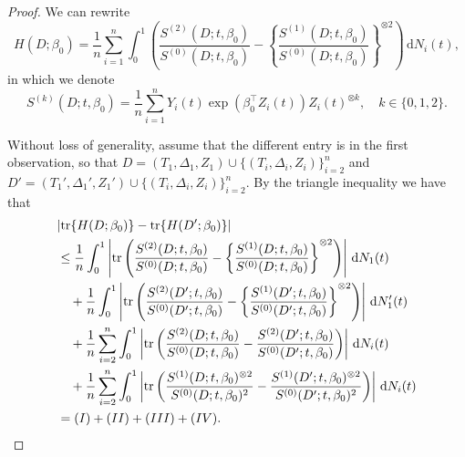 \documentclass[11pt]{article}
\newcommand{\dint}{\,\mathrm{d}}
\begin{document}
\begin{proof}
    We can rewrite  
\begin{equation*}
 H(D; \beta_0)  = \frac{1}{n} \sum_{i=1}^n \int_0^1 \left(\frac{S^{(2)}(D; t, \beta_0)}{{S}^{(0)}(D; t, \beta_0)} - \left\{ \frac{S^{(1)}(D; t, \beta_0)}{S^{(0)}(D; t, \beta_0)} \right\}^{\otimes 2}\right)  \dint N_i(t),
\end{equation*}
in which we denote
\begin{equation*}
    S^{(k)}(D; t, \beta_0) = \frac{1}{n}\sum_{i=1}^n Y_i(t) \exp(\beta_0^\top Z_i(t)) Z_i(t) ^{\otimes k}, \quad k \in \{0, 1, 2\}.
\end{equation*}

Without loss of generality, assume that the different entry is in the first observation, so that $D=(T_1, \Delta_1, Z_1) \cup \{(T_i, \Delta_i, Z_i)\}_{i=2}^n$ and $D'=(T_1', \Delta_1', Z_1') \cup \{(T_i, \Delta_i, Z_i)\}_{i=2}^n$. By the triangle inequality we have that 
\begin{align}
    &|\mathrm{tr}\{H(D; \beta_0)\} - \mathrm{tr}\{H(D'; \beta_0)\}| \notag\\
    &\leq \frac{1}{n} \int_0^1 \left| \mathrm{tr} \left(\frac{S^{(2)}(D; t, \beta_0)}{S^{(0)}(D; t, \beta_0)} - \left\{ \frac{S^{(1)}(D; t, \beta_0)}{S^{(0)}(D; t, \beta_0)} \right\}^{\otimes 2} \right) \right| \dint N_1(t)  \notag\\
    &\quad + \frac{1}{n}  \int_0^1 \left| \mathrm{tr} \left(\frac{S^{(2)}(D'; t, \beta_0)}{S^{(0)}(D'; t, \beta_0)} - \left\{ \frac{S^{(1)}(D'; t, \beta_0)}{S^{(0)}(D'; t, \beta_0)} \right\}^{\otimes 2} \right) \right|\dint N_1'(t) \notag \\ 
    &\quad + \frac{1}{n} \sum_{i=2}^n \int_0^1  \left| \mathrm{tr} \left(\frac{S^{(2)}(D; t, \beta_0)}{S^{(0)}(D; t, \beta_0)}  - \frac{S^{(2)}(D'; t, \beta_0)}{S^{(0)}(D'; t, \beta_0)} \right)\right| \dint N_i(t) \notag\\
    &\quad + \frac{1}{n} \sum_{i=2}^n \int_0^1 \left| \mathrm{tr} \left(\frac{S^{(1)}(D; t, \beta_0)^{\otimes 2}}{S^{(0)}(D; t, \beta_0)^2} - \frac{S^{(1)}(D'; t, \beta_0)^{\otimes 2}}{S^{(0)}(D'; t, \beta_0)^2} \right)\right| \dint N_i(t) \notag\\ 
    &= (I) + (II) + (III) + (IV).     \label{eq:trace_sensitivity_triangle}
\end{align}


\end{proof}
\end{document}
